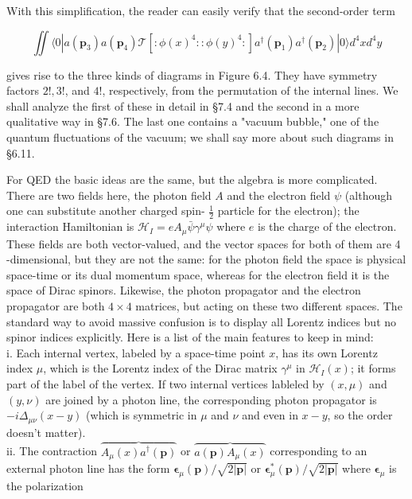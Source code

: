 \documentclass[10pt, letterpaper]{article}
\begin{document}
With this simplification, the reader can easily verify that the second-order term

$$
\iint\langle 0| a\left(\mathbf{p}_{3}\right) a\left(\mathbf{p}_{4}\right) \mathcal{T}\left[: \phi(x)^{4}:: \phi(y)^{4}:\right] a^{\dagger}\left(\mathbf{p}_{1}\right) a^{\dagger}\left(\mathbf{p}_{2}\right)|0\rangle d^{4} x d^{4} y
$$

gives rise to the three kinds of diagrams in Figure 6.4. They have symmetry factors $2!, 3!$, and $4!$, respectively, from the permutation of the internal lines. We shall analyze the first of these in detail in §7.4 and the second in a more qualitative way in §7.6. The last one contains a "vacuum bubble," one of the quantum fluctuations of the vacuum; we shall say more about such diagrams in §6.11.

For QED the basic ideas are the same, but the algebra is more complicated. There are two fields here, the photon field $A$ and the electron field $\psi$ (although one can substitute another charged spin- $\frac{1}{2}$ particle for the electron); the interaction Hamiltonian is $\mathscr{H}_{I}=e A_{\mu} \bar{\psi} \gamma^{\mu} \psi$ where $e$ is the charge of the electron. These fields are both vector-valued, and the vector spaces for both of them are 4 -dimensional, but they are not the same: for the photon field the space is physical space-time or its dual momentum space, whereas for the electron field it is the space of Dirac spinors. Likewise, the photon propagator and the electron propagator are both $4 \times 4$ matrices, but acting on these two different spaces. The standard way to avoid massive confusion is to display all Lorentz indices but no spinor indices explicitly. Here is a list of the main features to keep in mind:\\
i. Each internal vertex, labeled by a space-time point $x$, has its own Lorentz index $\mu$, which is the Lorentz index of the Dirac matrix $\gamma^{\mu}$ in $\mathcal{H}_{I}(x)$; it forms part of the label of the vertex. If two internal vertices lableled by $(x, \mu)$ and $(y, \nu)$ are joined by a photon line, the corresponding photon propagator is $-i \Delta_{\mu \nu}(x-y)$ (which is symmetric in $\mu$ and $\nu$ and even in $x-y$, so the order doesn't matter).\\
ii. The contraction $\overbrace{A_{\mu}(x) a^{\dagger}(\mathbf{p})}$ or $\overbrace{a(\mathbf{p}) A_{\mu}(x)}$ corresponding to an external photon line has the form $\boldsymbol{\epsilon}_{\mu}(\mathbf{p}) / \sqrt{2|\mathbf{p}|}$ or $\boldsymbol{\epsilon}_{\mu}^{*}(\mathbf{p}) / \sqrt{2|\mathbf{p}|}$ where $\boldsymbol{\epsilon}_{\mu}$ is the polarization\\
\end{document}
